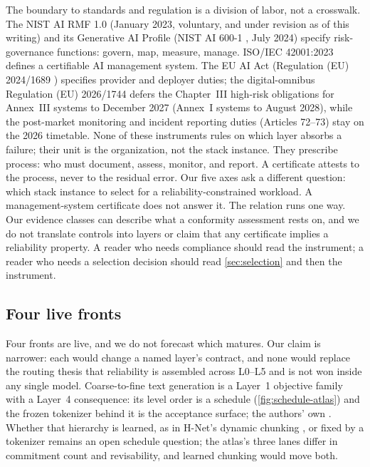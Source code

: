 The boundary to standards and regulation is a division of labor, not a crosswalk. The NIST AI
RMF 1.0 \cite{nistairmf} (January 2023, voluntary, and under revision as of this writing) and
its Generative AI Profile (NIST AI 600-1 \cite{nistgai600}, July 2024) specify risk-governance
functions: govern, map, measure, manage. ISO/IEC 42001:2023 \cite{iso42001} defines a
certifiable AI management system. The EU AI Act (Regulation (EU) 2024/1689 \cite{euaiact2024})
specifies provider and deployer duties; the digital-omnibus Regulation (EU) 2026/1744
\cite{omnibus2026} defers the Chapter~III high-risk obligations for Annex~III systems to December
2027 (Annex~I systems to August 2028), while the post-market monitoring and incident reporting
duties (Articles 72--73) stay on the 2026 timetable. None of these instruments rules on which layer absorbs a failure;
their unit is the organization, not the stack instance. They prescribe process: who must
document, assess, monitor, and report. A certificate attests to the process, never to the
residual error. Our five axes ask a different question: which stack instance to select for a
reliability-constrained workload. A management-system certificate does not answer it. The
relation runs one way. Our evidence classes can describe what a conformity assessment rests
on, and we do not translate controls into layers or claim that any certificate implies a
reliability property. A reader who needs compliance should read the instrument; a reader who
needs a selection decision should read \cref{sec:selection} and then the instrument.

\subsection{Four live fronts}
Four fronts are live, and we do not forecast which matures. Our claim is narrower: each would
change a named layer's contract, and none would replace the routing thesis that reliability is
assembled across L0--L5 and is not won inside any single model. Coarse-to-fine text generation
\cite{kumbong2026ncm,ncparch2026} is a Layer~1 objective family with a Layer~4 consequence: its
level order is a schedule (\cref{fig:schedule-atlas}) and the frozen tokenizer behind it is the
acceptance surface; the authors' own . Whether that hierarchy is learned, as in H-Net's dynamic chunking \cite{hnet2025}, or
fixed by a tokenizer remains an open schedule question; the atlas's three lanes differ in
commitment count and revisability, and learned chunking would move both.

